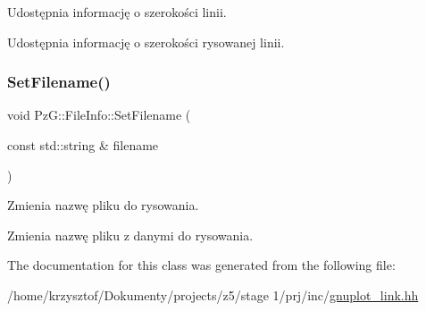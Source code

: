 Udostępnia informację o szerokości linii. 

Udostępnia informację o szerokości rysowanej linii. \mbox{\label{class_pz_g_1_1_file_info_a02c728f892c6f169b738adac8ed9d5f1}} 
\subsubsection{\texorpdfstring{Set\+Filename()}{SetFilename()}}
{\footnotesize\ttfamily void Pz\+G\+::\+File\+Info\+::\+Set\+Filename (\begin{DoxyParamCaption}\item[{const std\+::string \&}]{filename }\end{DoxyParamCaption})\hspace{0.3cm}{\ttfamily [inline]}}



Zmienia nazwę pliku do rysowania. 

Zmienia nazwę pliku z danymi do rysowania. 

The documentation for this class was generated from the following file\+:\begin{DoxyCompactItemize}
\item 
/home/krzysztof/\+Dokumenty/projects/z5/stage 1/prj/inc/\hyperlink{gnuplot__link_8hh}{gnuplot\+\_\+link.\+hh}\end{DoxyCompactItemize}
